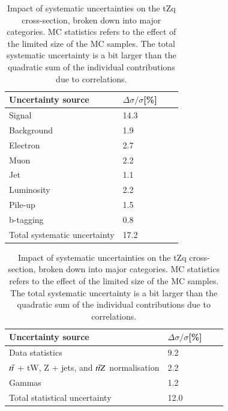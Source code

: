 \begin{table}[!h]
    \begin{minipage}{.49\textwidth}
      \centering
      \begin{adjustbox}{width=0.8\textwidth}
       \begin{tabular}{@{} *4l  @{}}
      \toprule
      Uncertainty source & $\Delta \sigma /\sigma$[\%]\\
     \midrule
      Signal &  14.3  \\[0.2ex]
      Background &  1.9  \\[0.2ex]
      Electron &   2.7 \\[0.2ex]
      Muon  &  2.2  \\[0.2ex]
      Jet &   1.1  \\[0.2ex]
     Luminosity  &  2.2  \\[0.2ex]
     Pile-up  &  1.5  \\[0.2ex]
     b-tagging  &  0.8  \\[0.2ex]
     \midrule
     Total systematic uncertainty &   17.2 \\[0.2ex]
     \bottomrule
 \end{tabular}
 \end{adjustbox}
    \end{minipage}%
    \hfill
    \begin{minipage}{.49\textwidth}
      \centering
      \vspace*{0.5cm}
      \begin{adjustbox}{width=\textwidth}
        \begin{tabular}{@{} *4l  @{}}
      \toprule
      Uncertainty source & $\Delta \sigma /\sigma$[\%]\\
     \midrule
     Data statistics & 9.2 \\[0.2ex]
     $t\Bar{t}$ + tW, Z + jets, and $t\Bar{t}Z$ normalisation & 2.2 \\[0.2ex]
     Gammas  &  1.2  \\[0.2ex]
     \midrule
     Total statistical uncertainty & 12.0 \\[0.2ex]
     \bottomrule
 \end{tabular}
 \end{adjustbox}
\end{minipage} 
\caption{ Impact of systematic uncertainties on the tZq cross-section, broken down into major categories. MC statistics refers to the effect of the limited size of the MC samples. The total systematic uncertainty is a bit larger than the quadratic sum of the individual contributions due to correlations.}
\label{tab:impact_table}
\end{table}



